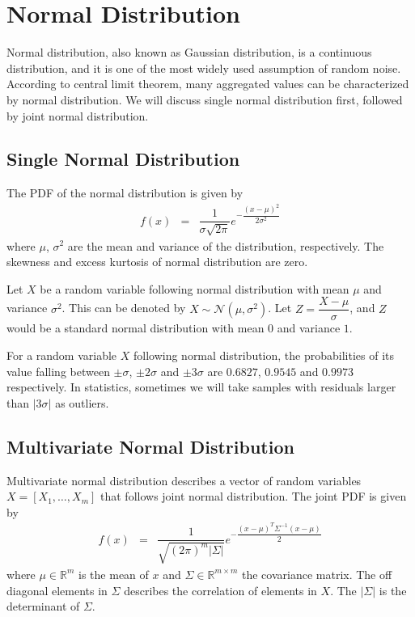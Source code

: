 \section{Normal Distribution}

Normal distribution, also known as Gaussian distribution, is a continuous distribution, and it is one of the most widely used assumption of random noise. According to central limit theorem, many aggregated values can be characterized by normal distribution. We will discuss single normal distribution first, followed by joint normal distribution.

\subsection{Single Normal Distribution}

The PDF of the normal distribution is given by
\begin{eqnarray}
  f(x) &=& \dfrac{1}{\sigma\sqrt{2\pi}}e^{-\dfrac{(x-\mu)^2}{2\sigma^2}} \nonumber
\end{eqnarray}
where $\mu$, $\sigma^2$ are the mean and variance of the distribution, respectively. The skewness and excess kurtosis of normal distribution are zero.

Let $X$ be a random variable following normal distribution with mean $\mu$ and variance $\sigma^2$. This can be denoted by $X\sim\mathcal{N}(\mu, \sigma^2)$. Let $Z=\dfrac{X-\mu}{\sigma}$, and $Z$ would be a standard normal distribution with mean $0$ and variance $1$.

For a random variable $X$ following normal distribution, the probabilities of its value falling between $\pm \sigma$, $\pm 2\sigma$ and $\pm 3\sigma$ are $0.6827$, $0.9545$ and $0.9973$ respectively. In statistics, sometimes we will take samples with residuals larger than $|3\sigma|$ as outliers.

\subsection{Multivariate Normal Distribution}

Multivariate normal distribution describes a vector of random variables $X = \left[X_1, \ldots, X_m\right]$ that follows joint normal distribution. The joint PDF is given by
\begin{eqnarray}
  f(x) &=& \dfrac{1}{\sqrt{(2\pi)^m|\Sigma|}}e^{-\dfrac{(x-\mu)^T\Sigma^{-1}(x-\mu)}{2}} \nonumber
\end{eqnarray}
where $\mu \in \mathbb{R}^m$ is the mean of $x$ and $\Sigma \in \mathbb{R}^{m\times m}$ the covariance matrix. The off diagonal elements in $\Sigma$ describes the correlation of elements in $X$. The $|\Sigma|$ is the determinant of $\Sigma$.


